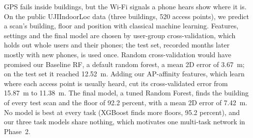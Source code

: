 GPS fails inside buildings, but the Wi-Fi signals a phone hears show where it
is. On the public UJIIndoorLoc data (three buildings, 520 access points), we
predict a scan's building, floor and position with classical machine learning.
Features, settings and the final model are chosen by user-group
cross-validation, which holds out whole users and their phones; the test set,
recorded months later mostly with new phones, is used once. Random
cross-validation would have promised our Baseline RF, a default random forest,
a mean 2D error of 3.67~m; on the test set it reached 12.52~m. Adding our AP-affinity features, which learn where each access
point is usually heard, cut its cross-validated error from 15.87~m to 11.38~m.
The final model, a tuned Random Forest, finds the building of every test scan
and the floor of 92.2 percent, with a mean 2D error of 7.42~m. No model is best
at every task (XGBoost finds more floors, 95.2 percent), and our three task
models share nothing, which motivates one multi-task network in Phase~2.
